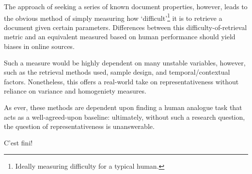 The approach of seeking a series of known document properties, however, leads to the obvious method of simply measuring how `difficult'\footnote{Ideally measuring difficulty for a typical human.} it is to retrieve a document given certain parameters.  Differences between this difficulty-of-retrieval metric and an equivalent measured based on human performance should yield biases in online sources.

Such a measure would be highly dependent on many unstable variables, however, such as the retrieval methods used, sample design, and temporal/contextual factors.  Nonetheless, this offers a real-world take on representativeness without reliance on variance and homogeniety measures.

As ever, these methods are dependent upon finding a human analogue task that acts as a well-agreed-upon baseline: ultimately, without such a research question, the question of representativeness is unanswerable.




\begin{center}
\vfill
{\selectfont C'est fini!}
\vfill
\end{center}



